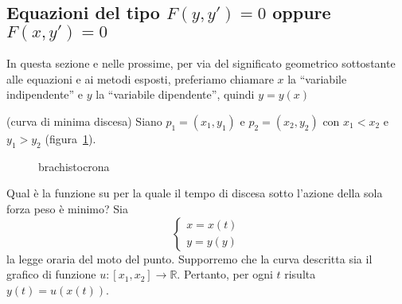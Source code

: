 \subsection{Equazioni del tipo \(F{(y, y')} = 0\) oppure \(F{(x, y')} = 0\) }
In questa sezione e nelle prossime, per via del significato geometrico
sottostante alle equazioni e ai metodi esposti, preferiamo chiamare \(x\) la
``variabile indipendente'' e \(y\) la ``variabile dipendente'', quindi \(y =
y{(x)}\) 
\begin{example}[Brachistocrona]
    (curva di minima discesa) 
    Siano \(p_{1} = {(x_{1}, y_{1})}\) e \(p_{2} = {(x_{2}, y_{2})}\) con
    \(x_{1} < x_{2}\) e \(y_{1} > y_{2}\) (figura~\ref{fig:brachistocrona}).
\begin{figure}[ht]
    \centering
    \caption{brachistocrona}\label{fig:brachistocrona}
\end{figure}

    Qual è la funzione su per la quale il tempo di discesa sotto
    l'azione della sola forza peso è minimo? Sia 
    \[
      \begin{cases}
          x = x{(t)} \\
          y = y{(y)}
      \end{cases}
    \]
    la legge oraria del moto del punto. Supporremo che la curva descritta sia il
    grafico di funzione \(u : [x_{1},x_{2}] \to \mathbb{R}\). Pertanto, per ogni
    \(t\) risulta \(y{(t)} = u{(x{(t)})}\). 


\end{example}
